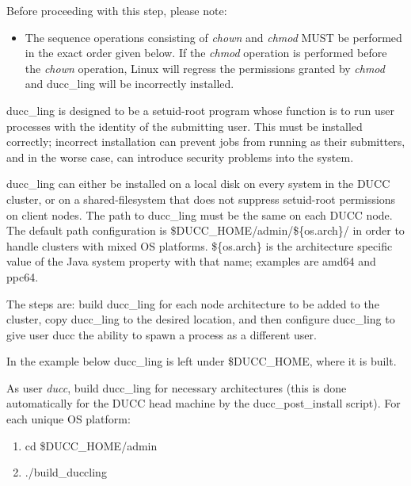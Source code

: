     Before proceeding with this step, please note: 
    \begin{itemize}
        \item The sequence operations consisting of {\em chown} and {\em chmod} MUST be performed
          in the exact order given below.  If the {\em chmod} operation is performed before
          the {\em chown} operation, Linux will regress the permissions granted by {\em chmod} 
          and ducc\_ling will be incorrectly installed.
    \end{itemize}

    ducc\_ling is designed to be a setuid-root program whose function is to run user processes with the identity of
    the submitting user. This must be installed correctly; incorrect installation can prevent jobs from running as
    their submitters, and in the worse case, can introduce security problems into the system.

    ducc\_ling can either be installed on a local disk on every system in the DUCC cluster, 
    or on a shared-filesystem that does not suppress setuid-root permissions on client nodes.
    The path to ducc\_ling must be the same on each DUCC node. 
    The default path configuration is
    \${DUCC\_HOME}/admin/\$\{os.arch\}/ in order to handle clusters with mixed OS platforms.
    \$\{os.arch\} is the architecture specific value of the Java system property with that name;
    examples are amd64 and ppc64.
   
	The steps are: build ducc\_ling for each node architecture to be added to the cluster,
	copy ducc\_ling to the desired location, and then configure ducc\_ling to give user
	ducc the ability to spawn a process as a different user.

    In the example below ducc\_ling is left under \$DUCC\_HOME, where it is built.

    As user {\em ducc}, build ducc\_ling for necessary architectures (this is done
    automatically for the DUCC head machine by the ducc\_post\_install script).
    For each unique OS platform:
    \begin{enumerate}
        \item cd \$DUCC\_HOME/admin
        \item ./build\_duccling
     \end{enumerate}


